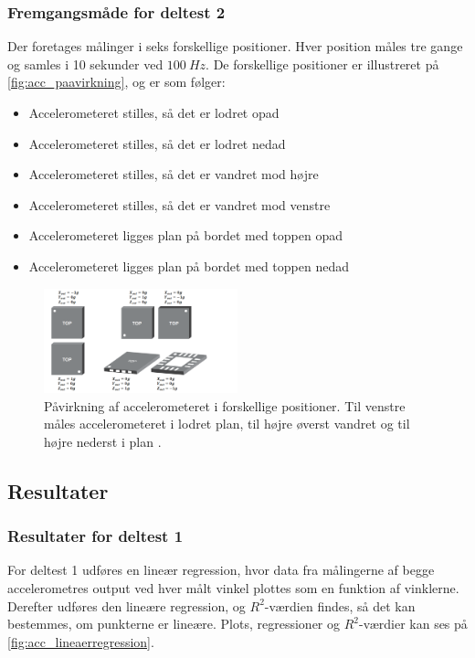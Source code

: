 \subsubsection{Fremgangsmåde for deltest 2}\label{sec:acc_fremgangsmaade}
Der foretages målinger i seks forskellige positioner. Hver position måles tre gange og samles i 10 sekunder ved $100~Hz$. De forskellige positioner er illustreret på \autoref{fig:acc_paavirkning}, og er som følger: 
\begin{itemize}
\item Accelerometeret stilles, så det er lodret opad
\item Accelerometeret stilles, så det er lodret nedad
\item Accelerometeret stilles, så det er vandret mod højre
\item Accelerometeret stilles, så det er vandret mod venstre
\item Accelerometeret ligges plan på bordet med toppen opad
\item Accelerometeret ligges plan på bordet med toppen nedad
\end{itemize}

\begin{figure}[H]
\centering
\includegraphics[width=0.5\textwidth]{figures/acc_paavirkning}
\caption{Påvirkning af accelerometeret i forskellige positioner. Til venstre måles accelerometeret i lodret plan, til højre øverst vandret og til højre nederst i plan \citep{analogdevices2010}.}
\label{fig:acc_paavirkning}
\end{figure}

\subsection{Resultater} 

\subsubsection{Resultater for deltest 1}
For deltest 1 udføres en lineær regression, hvor data fra målingerne af begge accelerometres output ved hver målt vinkel plottes som en funktion af vinklerne. Derefter udføres den lineære regression, og $R^2$-værdien findes, så det kan bestemmes, om punkterne er lineære. Plots, regressioner og $R^2$-værdier kan ses på \autoref{fig:acc_lineaerregression}.


